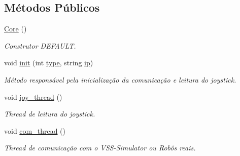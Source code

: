 \subsection*{Métodos Públicos}
\begin{DoxyCompactItemize}
\item 
\hyperlink{classCore_a14e63188e0aa7c4a6f72d5501384d1f9}{Core} ()
\begin{DoxyCompactList}\small\item\em Construtor D\+E\+F\+A\+U\+LT. \end{DoxyCompactList}\item 
void \hyperlink{classCore_aadc741ed2198a71a4246435102ad13d2}{init} (int \hyperlink{classCore_a6f97de806c6e3e70a28d17e9ff91e52a}{type}, string \hyperlink{classCore_a8b79534f9c58257910e3fce2ad36c7e2}{ip})
\begin{DoxyCompactList}\small\item\em Método responsável pela inicialização da comunicação e leitura do joystick. \end{DoxyCompactList}\item 
void \hyperlink{classCore_aaa2301f0963098a87ba10e10a7cc144b}{joy\+\_\+thread} ()\hypertarget{classCore_aaa2301f0963098a87ba10e10a7cc144b}{}\label{classCore_aaa2301f0963098a87ba10e10a7cc144b}

\begin{DoxyCompactList}\small\item\em Thread de leitura do joystick. \end{DoxyCompactList}\item 
void \hyperlink{classCore_a029834e06cd6cc9d750c262308d80513}{com\+\_\+thread} ()
\begin{DoxyCompactList}\small\item\em Thread de comunicação com o V\+S\+S-\/\+Simulator ou Robôs reais. \end{DoxyCompactList}\end{DoxyCompactItemize}
